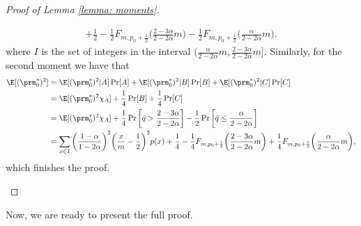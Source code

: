 \begin{proof}[Proof of Lemma \ref{lemma: moments}]
\begin{enumerate}[(i)]
\begin{align*}
                + \frac12  - \frac12 F_{m, p_0 + \frac12}\bigg( \frac{2 -
                3\alpha}{2-2\alpha}m \bigg)
                - \frac12 F_{m, p_0 + \frac12}\bigg( \frac{\alpha
                }{2-2\alpha}m\bigg).
            \end{align*}
            where $I$ is the set of integers in the interval $( \frac{\alpha
            }{2 - 2\alpha}m, \frac{2-3\alpha}{2 - 2\alpha} m]$. Similarly, for
            the second moment we have that
            \begin{align*}
                \E[(\prm^\ast_0)^2] &= \E[(\prm^\ast_0)^2 | A] \Pr[A] +
                \E[(\prm^\ast_0)^2 | B] \Pr[B] + \E[(\prm^\ast_0)^2 | C]
                \Pr[C]\\
                &= \E[(\prm^\ast_0)^2 \chi_{A}] + \frac14 \Pr[B] + \frac14
                \Pr[C]\\
                &= \E[(\prm^\ast_0)^2 \chi_{A}] + \frac14 \Pr\bigg[\bar{q}
                > \frac{2-3\alpha}{2-2\alpha}\bigg] - \frac12
                \Pr\bigg[\bar{q} \le \frac{\alpha}{2-2\alpha}\bigg]\\
                &= \sum_{x \in I} \bigg(\frac{1 - \alpha}{1-2\alpha}\bigg)^2
                \bigg(\frac{x}{m} - \frac12 \bigg)^2 p(x)
                + \frac14  - \frac14 F_{m, p_0 + \frac12}\bigg( \frac{2 -
                3\alpha}{2-2\alpha}m \bigg)
                + \frac14 F_{m, p_0 + \frac12}\bigg( \frac{\alpha
                }{2-2\alpha}m\bigg),
            \end{align*}
            which finishes the proof.
    \end{enumerate}
\end{proof}

Now, we are ready to present the full proof.

